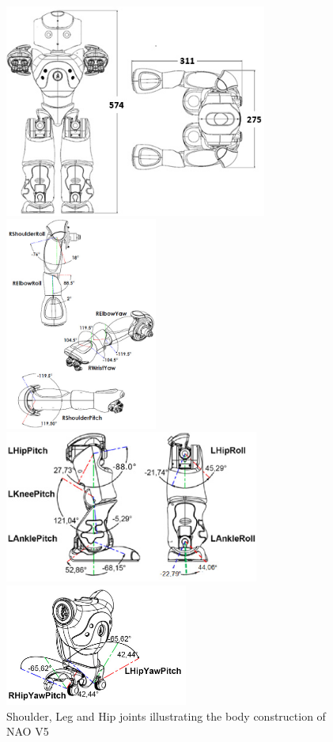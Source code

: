 \begin{figure}
	\begin{minipage}
		{.6
			\textwidth} 
		\includegraphics[height=7cm]{figures/content/nao-body.jpg} 
	\end{minipage}
	\begin{minipage}
		{.4 
			\textwidth} 
		\includegraphics[height=7cm]{figures/content/nao-hand.jpg} 
	\end{minipage}
	\begin{minipage}
		{.6 
			\textwidth} 
		\includegraphics[height=50mm]{figures/content/nao-leg.jpg} 
	\end{minipage}
	\begin{minipage}
		{.4 
			\textwidth} 
		\includegraphics[height=40mm]{figures/content/nao-hip.jpg} 
	\end{minipage}
	\caption{Shoulder, Leg and Hip joints illustrating the body construction of NAO V5 \cite{nao-spec}} \label{fg:nao:body} 
\end{figure}
